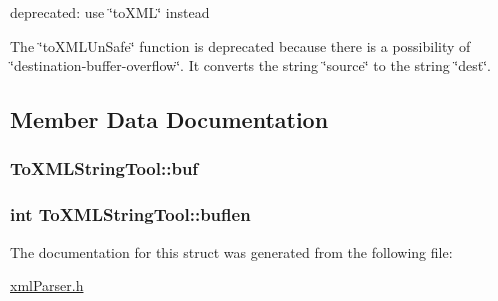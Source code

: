 deprecated\-: use \char`\"{}to\-X\-M\-L\char`\"{} instead 

The \char`\"{}to\-X\-M\-L\-Un\-Safe\char`\"{} function is deprecated because there is a possibility of \char`\"{}destination-\/buffer-\/overflow\char`\"{}. It converts the string \char`\"{}source\char`\"{} to the string \char`\"{}dest\char`\"{}. 

\subsection{Member Data Documentation}
\hypertarget{structToXMLStringTool_a7c1744df32f207ecc8e4e478c350e83a}{
\subsubsection[{buf}]{ To\-X\-M\-L\-String\-Tool\-::buf\hspace{0.3cm}{\ttfamily [private]}}}\label{structToXMLStringTool_a7c1744df32f207ecc8e4e478c350e83a}
\hypertarget{structToXMLStringTool_a3d8ae5dc73498c16afdb2905bf00c9d0}{
\subsubsection[{buflen}]{\setlength{\rightskip}{0pt plus 5cm}int To\-X\-M\-L\-String\-Tool\-::buflen\hspace{0.3cm}{\ttfamily [private]}}}\label{structToXMLStringTool_a3d8ae5dc73498c16afdb2905bf00c9d0}


The documentation for this struct was generated from the following file\-:\begin{DoxyCompactItemize}
\item 
\hyperlink{xmlParser_8h}{xml\-Parser.\-h}\end{DoxyCompactItemize}
